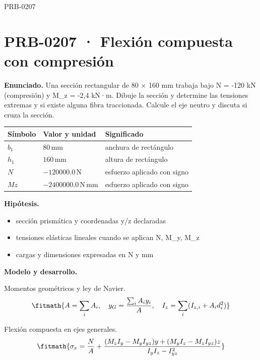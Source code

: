 \begin{studiumworked}{PRB-0207}

\section{PRB-0207 · Flexión compuesta con compresión}

\textbf{Enunciado.} Una sección rectangular de 80 \ensuremath{\times} 160 mm trabaja bajo N = -120 kN (compresión) y M\_z = -2,4 kN·m. Dibuje la sección y determine las tensiones extremas y si existe alguna fibra traccionada. Calcule el eje neutro y discuta si cruza la sección.

\par\medskip\noindent\begin{tabular}{@{}p{.18\linewidth}p{.26\linewidth}p{.48\linewidth}@{}}
\toprule Símbolo & Valor y unidad & Significado\\\midrule
$b_{1}$ & $80\,\mathrm{mm}$ & anchura de rectángulo\\
$h_{1}$ & $160\,\mathrm{mm}$ & altura de rectángulo\\
$N$ & $-120000.0\,\mathrm{N}$ & esfuerzo aplicado con signo\\
$Mz$ & $-2400000.0\,\mathrm{N\,mm}$ & esfuerzo aplicado con signo\\
\bottomrule\end{tabular}\par\medskip

\textbf{Hipótesis.}\begin{itemize}\item sección prismática y coordenadas y/z declaradas
\item tensiones elásticas lineales cuando se aplican N, M\_y, M\_z
\item cargas y dimensiones expresadas en N y mm\end{itemize}

\textbf{Modelo y desarrollo.}

Momentos geométricos y ley de Navier.\[\fitmath{A = \sum_i A_i,\quad y_G = \frac{\sum_i A_i y_i}{A},\quad I_z = \sum_i (I_{z,i}+A_i d_i^2)}\]

Flexión compuesta en ejes generales.\[\fitmath{\sigma_x = \frac{N}{A}+\frac{(M_z I_y-M_y I_{yz})y+(M_y I_z-M_z I_{yz})z}{I_y I_z-I_{yz}^{2}}}\]


\end{studiumworked}
